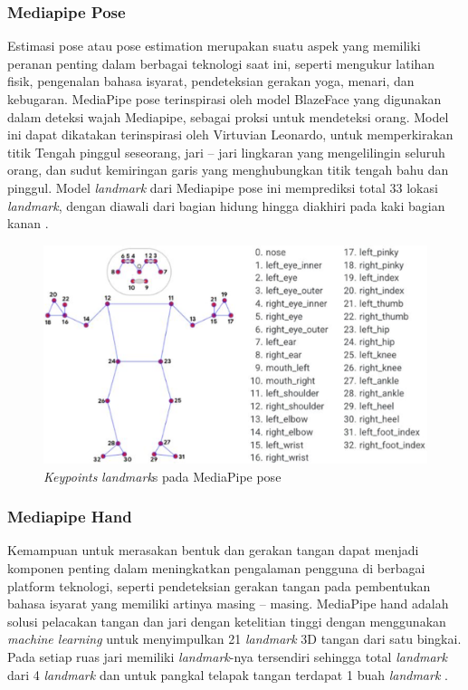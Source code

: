\subsubsection{Mediapipe Pose}
Estimasi pose atau pose estimation merupakan suatu aspek yang memiliki peranan penting dalam berbagai teknologi saat ini, seperti mengukur latihan fisik, pengenalan bahasa isyarat, pendeteksian gerakan yoga, menari, dan kebugaran. MediaPipe pose terinspirasi oleh model BlazeFace yang digunakan dalam deteksi wajah Mediapipe, sebagai proksi untuk mendeteksi orang. Model ini dapat dikatakan terinspirasi oleh Virtuvian Leonardo, untuk memperkirakan titik Tengah pinggul seseorang, jari – jari lingkaran yang mengelilingin seluruh orang, dan sudut kemiringan garis yang menghubungkan titik tengah bahu dan pinggul. Model \emph{landmark} dari Mediapipe pose ini memprediksi total 33 lokasi \emph{landmark}, dengan diawali dari bagian hidung hingga diakhiri pada kaki bagian kanan \parencite{googleMediapipe}. 

\begin{figure}[H]
    \centering

    \includegraphics[scale=0.5]{gambar/bab2-mp-pose.png}
 
    \caption{\textit{Keypoints} \emph{landmark}s pada MediaPipe pose}
    \label{fig:mediapipepose}
\end{figure}

\subsubsection{Mediapipe Hand}
Kemampuan untuk merasakan bentuk dan gerakan tangan dapat menjadi komponen penting dalam meningkatkan pengalaman pengguna di berbagai platform teknologi, seperti pendeteksian gerakan tangan pada pembentukan bahasa isyarat yang memiliki artinya masing – masing. MediaPipe hand adalah solusi pelacakan tangan dan jari dengan ketelitian tinggi dengan menggunakan \textit{machine learning} untuk menyimpulkan 21 \emph{landmark} 3D tangan dari satu bingkai. Pada setiap ruas jari memiliki \emph{landmark}-nya tersendiri sehingga total \emph{landmark} dari 4 \emph{landmark} dan untuk pangkal telapak tangan terdapat 1 buah \emph{landmark} \parencite{googleMediapipe}.

